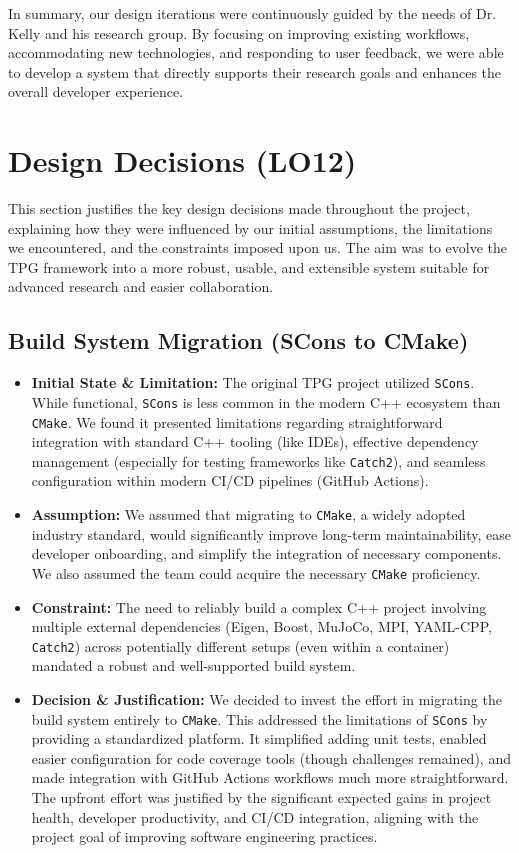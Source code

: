 \documentclass{article}
\begin{document}
In summary, our design iterations were continuously guided by the needs of Dr. Kelly and his research group. By focusing on improving existing workflows, accommodating new technologies, and responding to user feedback, we were able to develop a system that directly supports their research goals and enhances the overall developer experience.


\section{Design Decisions (LO12)}

This section justifies the key design decisions made throughout the project, explaining how they were influenced by our initial assumptions, the limitations we encountered, and the constraints imposed upon us. The aim was to evolve the TPG framework into a more robust, usable, and extensible system suitable for advanced research and easier collaboration.

\subsection{Build System Migration (SCons to CMake)}
\begin{itemize}
    \item \textbf{Initial State \& Limitation:} The original TPG project utilized \texttt{SCons}. While functional, \texttt{SCons} is less common in the modern C++ ecosystem than \texttt{CMake}. We found it presented limitations regarding straightforward integration with standard C++ tooling (like IDEs), effective dependency management (especially for testing frameworks like \texttt{Catch2}), and seamless configuration within modern CI/CD pipelines (GitHub Actions).
    \item \textbf{Assumption:} We assumed that migrating to \texttt{CMake}, a widely adopted industry standard, would significantly improve long-term maintainability, ease developer onboarding, and simplify the integration of necessary components. We also assumed the team could acquire the necessary \texttt{CMake} proficiency.
    \item \textbf{Constraint:} The need to reliably build a complex C++ project involving multiple external dependencies (Eigen, Boost, MuJoCo, MPI, YAML-CPP, \texttt{Catch2}) across potentially different setups (even within a container) mandated a robust and well-supported build system.
    \item \textbf{Decision \& Justification:} We decided to invest the effort in migrating the build system entirely to \texttt{CMake}. This addressed the limitations of \texttt{SCons} by providing a standardized platform. It simplified adding unit tests, enabled easier configuration for code coverage tools (though challenges remained), and made integration with GitHub Actions workflows much more straightforward. The upfront effort was justified by the significant expected gains in project health, developer productivity, and CI/CD integration, aligning with the project goal of improving software engineering practices.
\end{itemize}
\end{document}
